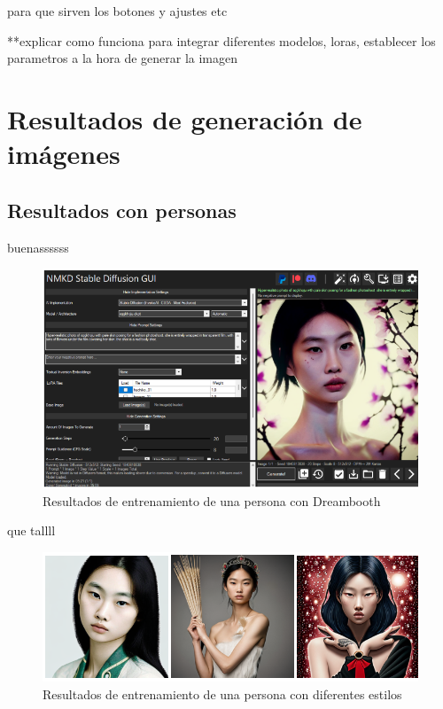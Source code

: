  
para que sirven los botones y ajustes etc

**explicar como funciona para integrar diferentes modelos, loras, establecer los parametros a la hora de generar la imagen

\section{Resultados de generación de imágenes}




\subsection{Resultados con personas}
buenassssss\\

\begin{figure}[!htb]
	\centering
	\includegraphics[width = 1
	\textwidth]{Imagenes/Vectorial/hoyeon1.png}
	\caption{Resultados de entrenamiento de una persona con Dreambooth}
	\label{fig:hoyeonsd}
\end{figure}

que tallll\\

\begin{figure}[!htb]
	\centering
	\includegraphics[width = 1
	\textwidth]{Imagenes/Vectorial/hoyeon_results.png}
	\caption{Resultados de entrenamiento de una persona con diferentes estilos}
	\label{fig:imagshoyeon}
\end{figure}

